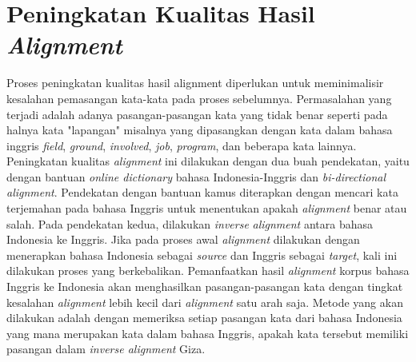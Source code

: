 \section{Peningkatan Kualitas Hasil \textit{Alignment}}
Proses peningkatan kualitas hasil alignment diperlukan untuk meminimalisir kesalahan pemasangan kata-kata pada proses sebelumnya. Permasalahan  yang terjadi adalah adanya pasangan-pasangan kata yang tidak benar seperti pada halnya kata "lapangan" misalnya yang  dipasangkan dengan kata dalam bahasa inggris \textit{field}, \textit{ground}, \textit{involved}, \textit{job}, \textit{program}, dan beberapa kata lainnya. Peningkatan kualitas \textit{alignment} ini dilakukan dengan dua buah pendekatan, yaitu dengan bantuan \textit{online dictionary} bahasa Indonesia-Inggris dan \textit{bi-directional alignment}. Pendekatan dengan bantuan kamus diterapkan dengan mencari kata terjemahan pada bahasa Inggris untuk menentukan apakah \textit{alignment} benar atau salah. Pada pendekatan kedua, dilakukan \textit{inverse} \textit{alignment} antara bahasa Indonesia ke Inggris. Jika pada proses awal \textit{alignment} dilakukan dengan menerapkan bahasa Indonesia sebagai \textit{source} dan Inggris sebagai \textit{target}, kali ini dilakukan proses yang berkebalikan. Pemanfaatkan hasil \textit{alignment} korpus bahasa Inggris ke Indonesia akan menghasilkan pasangan-pasangan kata dengan tingkat kesalahan \textit{alignment} lebih kecil dari \textit{alignment} satu arah saja. Metode yang akan dilakukan adalah dengan memeriksa setiap pasangan kata dari bahasa Indonesia yang mana merupakan kata dalam bahasa Inggris, apakah kata tersebut memiliki pasangan dalam \textit{inverse alignment} Giza.

